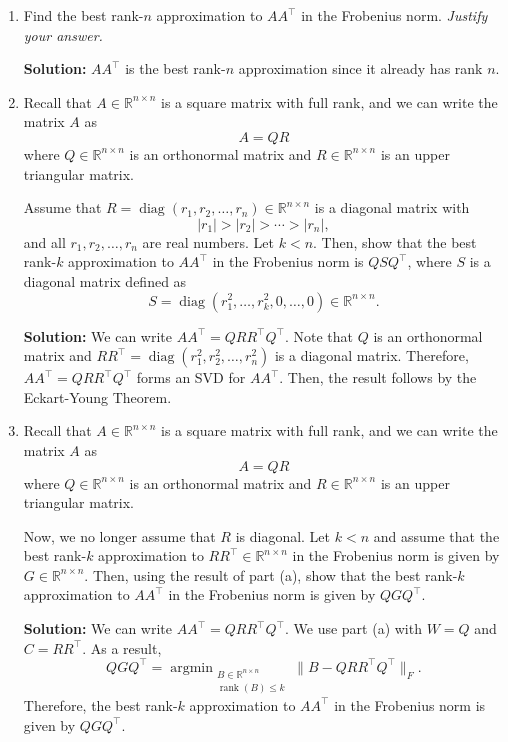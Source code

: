 \documentclass[10pt]{article}
\theoremstyle{definition}
\theoremstyle{plain}
\newcommand{\RR}{\mathbb{R}}
\DeclareMathOperator{\rank}{rank}
\DeclareMathOperator{\diag}{diag}
\DeclareMathOperator*{\argmin}{argmin}
\begin{document}
\begin{enumerate}[label=(\alph*), resume]
    \item Find the best rank-$n$ approximation to $AA^\top$ in the Frobenius norm. \emph{Justify your answer.}

    \textbf{Solution:} $AA^\top$ is the best rank-$n$ approximation since it already has rank $n$.

    \item Recall that $A \in \RR^{n \times n}$ is a square matrix with full rank, and we can write the matrix $A$ as
    \begin{equation}
        A = QR
    \end{equation}
    where $Q \in \RR^{n \times n}$ is an orthonormal matrix and $R \in \RR^{n \times n}$ is an upper triangular matrix.

    Assume that $R = \diag(r_1, r_2, \ldots, r_n) \in \RR^{n \times n}$ is a diagonal matrix with
    \[
        |r_1| > |r_2| > \cdots > |r_n|,
    \]
    and all $r_1, r_2, \ldots, r_n$ are real numbers. Let $k < n$. Then, show that the best rank-$k$ approximation to $AA^\top$ in the Frobenius norm is $QSQ^\top$, where $S$ is a diagonal matrix defined as
    \[
        S = \diag(r_1^2, \ldots, r_k^2, 0, \ldots, 0) \in \RR^{n \times n}.
    \]

    \textbf{Solution:} We can write $AA^\top = QRR^\top Q^\top$. Note that $Q$ is an orthonormal matrix and $RR^\top = \diag(r_1^2, r_2^2, \ldots, r_n^2)$ is a diagonal matrix. Therefore, $AA^\top = QRR^\top Q^\top$ forms an SVD for $AA^\top$. Then, the result follows by the Eckart-Young Theorem.

    \item Recall that $A \in \RR^{n \times n}$ is a square matrix with full rank, and we can write the matrix $A$ as
    \begin{equation}
        A = QR
    \end{equation}
    where $Q \in \RR^{n \times n}$ is an orthonormal matrix and $R \in \RR^{n \times n}$ is an upper triangular matrix.

    Now, we no longer assume that $R$ is diagonal. Let $k < n$ and assume that the best rank-$k$ approximation to $RR^\top \in \RR^{n \times n}$ in the Frobenius norm is given by $G \in \RR^{n \times n}$. Then, using the result of part (a), show that the best rank-$k$ approximation to $AA^\top$ in the Frobenius norm is given by $QGQ^\top$.

    \textbf{Solution:} We can write $AA^\top = QRR^\top Q^\top$. We use part (a) with $W = Q$ and $C = RR^\top$. As a result,
    \[
        QGQ^\top = \argmin_{\substack{B \in \RR^{n \times n} \\ \rank(B) \le k}} \|B - QRR^\top Q^\top\|_F.
    \]
    Therefore, the best rank-$k$ approximation to $AA^\top$ in the Frobenius norm is given by $QGQ^\top$.
\end{enumerate}
\end{document}
